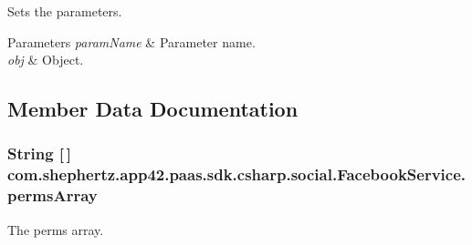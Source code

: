 Sets the parameters. 


\begin{DoxyParams}{Parameters}
{\em param\+Name} & Parameter name.\\
\hline
{\em obj} & Object.\\
\hline
\end{DoxyParams}


\subsection{Member Data Documentation}
\hypertarget{classcom_1_1shephertz_1_1app42_1_1paas_1_1sdk_1_1csharp_1_1social_1_1_facebook_service_ad8e49c202177d2d0bf46d1e6c486862b}{
\subsubsection[{perms\+Array}]{\setlength{\rightskip}{0pt plus 5cm}String \mbox{[}$\,$\mbox{]} com.\+shephertz.\+app42.\+paas.\+sdk.\+csharp.\+social.\+Facebook\+Service.\+perms\+Array\hspace{0.3cm}{\ttfamily [static]}}}\label{classcom_1_1shephertz_1_1app42_1_1paas_1_1sdk_1_1csharp_1_1social_1_1_facebook_service_ad8e49c202177d2d0bf46d1e6c486862b}


The perms array. 

